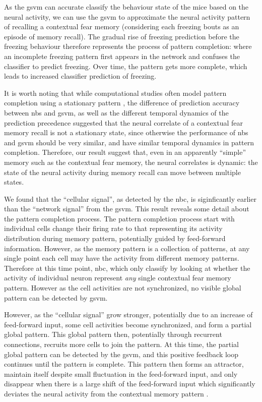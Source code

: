 As the \gls{gsvm} can accurate classify the behaviour state of the mice based on the neural activity, we can use the \gls{gsvm} to approximate the neural activity pattern of recalling a contextual fear memory (considering each freezing bouts as an episode of memory recall). The gradual rise of freezing prediction before the freezing behaviour therefore represents the process of pattern completion: where an incomplete freezing pattern first appears in the network and confuses the classifier to predict freezing. Over time, the pattern gets more complete, which leads to increased classifier prediction of freezing. 

It is worth noting that while computational studies often model pattern completion using a stationary pattern \citep{rolls13}, the difference of prediction accuracy between \gls{nbs} and \gls{gsvm}, as well as the different temporal dynamics of the prediction precedence suggested that the neural correlate of a contextual fear memory recall is not a stationary state, since otherwise the performance of \gls{nbs} and \gls{gsvm} should be very similar, and have similar temporal dynamics in pattern completion. Therefore, our result suggest that, even in an apparently ``simple'' memory such as the contextual fear memory, the neural correlates is dynamic: the state of the neural activity during memory recall can move between multiple states.

We found that the ``cellular signal'', as detected by the \gls{nbc}, is siginficantly earlier than the ``network signal'' from the \gls{gsvm}. This result reveals some detail about the pattern completion process. The pattern completion process start with individual cells change their firing rate to that representing its activity distribution during memory pattern, potentially guided by feed-forward information. However, as the memory pattern is a collection of patterns, at any single point each cell may have the activity from different memory patterns. Therefore at this time point, \gls{nbc}, which only classify by looking at whether the activity of individual neuron represent \textit{any} single contextual fear memory pattern. However as the cell activities are not synchronized, no visible global pattern can be detected by \gls{gsvm}. 

However, as the ``cellular signal'' grow stronger, potentially due to an increase of feed-forward input, some cell activities become synchronized, and form a partial global pattern. This global pattern then, potentially through recurrent connections, recruits more cells to join the pattern. At this time, the partial global pattern can be detected by the \gls{gsvm}, and this positive feedback loop continues until the pattern is complete. This pattern then forms an attractor, maintain itself despite small fluctuation in the feed-forward input, and only disappear when there is a large shift of the feed-forward input which significantly deviates the neural activity from the contextual memory pattern \citep{rolls13}. 

